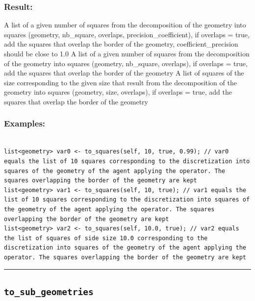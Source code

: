 \documentclass[]{book}
\theoremstyle{definition}
\theoremstyle{definition}
\theoremstyle{definition}
\theoremstyle{remark}
\begin{document}
\subsubsection{Result:}\label{result-505}

A list of a given number of squares from the decomposition of the
geometry into squares (geometry, nb\_square, overlaps,
precision\_coefficient), if overlaps = true, add the squares that
overlap the border of the geometry, coefficient\_precision should be
close to 1.0 A list of a given number of squares from the decomposition
of the geometry into squares (geometry, nb\_square, overlaps), if
overlaps = true, add the squares that overlap the border of the geometry
A list of squares of the size corresponding to the given size that
result from the decomposition of the geometry into squares (geometry,
size, overlaps), if overlaps = true, add the squares that overlap the
border of the geometry

\subsubsection{Examples:}\label{examples-361}

\begin{verbatim}
 
list<geometry> var0 <- to_squares(self, 10, true, 0.99); // var0 equals the list of 10 squares corresponding to the discretization into squares of the geometry of the agent applying the operator. The squares overlapping the border of the geometry are kept 
list<geometry> var1 <- to_squares(self, 10, true); // var1 equals the list of 10 squares corresponding to the discretization into squares of the geometry of the agent applying the operator. The squares overlapping the border of the geometry are kept 
list<geometry> var2 <- to_squares(self, 10.0, true); // var2 equals the list of squares of side size 10.0 corresponding to the discretization into squares of the geometry of the agent applying the operator. The squares overlapping the border of the geometry are kept
\end{verbatim}

\begin{center}\rule{0.5\linewidth}{\linethickness}\end{center}

\subsection{\texorpdfstring{\texttt{to\_sub\_geometries}}{to\_sub\_geometries}}\label{to_sub_geometries}
\end{document}
